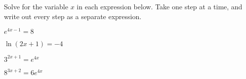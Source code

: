 
\begin{problem}
\item Solve for the variable $x$ in each expression below. Take one
  step at a time, and write out every step as a separate expression.
  \begin{subproblem}
  \item $e^{4x-1}  =  8$
    \vfill
  \item $\ln(2x+1)  =  -4$
    \vfill
  \item $3^{2x+1}  =  e^{4x}$
    \vfill
  \item $8^{3x+2}  =  6e^{4x}$
    \vfill
  \end{subproblem}
\end{problem}


